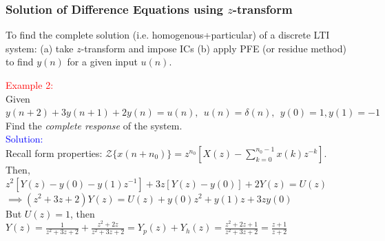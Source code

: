 \documentclass[mathserif, 10pt]{beamer} %
\begin{document}
{

\normalsize

\frametitle{Solution of Difference Equations using $z$-transform}
To find the complete solution (i.e. homogenous+particular) of a discrete LTI system: (a) take $z$-transform and impose ICs (b) apply PFE (or residue method) to find $y(n)$ for a given input $u(n)$.

\vspace{0.05in}
\textcolor{red}{Example 2:}\\
Given $y(n+2) +3y(n+1) +2y(n) = u(n), ~~ u(n) = \delta(n),~~ y(0)=1,y(1)=-1$\\
Find the \textit{complete response} of the system.\\
\textcolor{blue}{Solution:}\\ Recall form properties:  $ \mathcal{Z} \{x(n+n_0) \} = z^{n_0}[X(z)- \sum\limits_{k=0}^{n_0-1} x(k) z^{-k}]$. \\
Then, \\
$z^2[Y(z)-y(0)-y(1)z^{-1}]+3z[Y(z)-y(0)] +2Y(z)  = U(z)$\\ \vspace{.1in}
$\implies (z^2+3z+2)Y(z) = U(z)+y(0)z^2 +y(1)z + 3zy(0)$ \\
But $U(z)=1$, then \\ \vspace{.1in}
$Y(z) = \frac{1}{z^2+3z+2}+\frac{z^2+2z}{z^2+3z+2} = Y_{p}(z)+ Y_{h}(z)= \frac{z^2+2z+1}{z^2+3z+2}=\frac{z+1}{z+2}$\\ \vspace{.1in}
}
\end{document}
